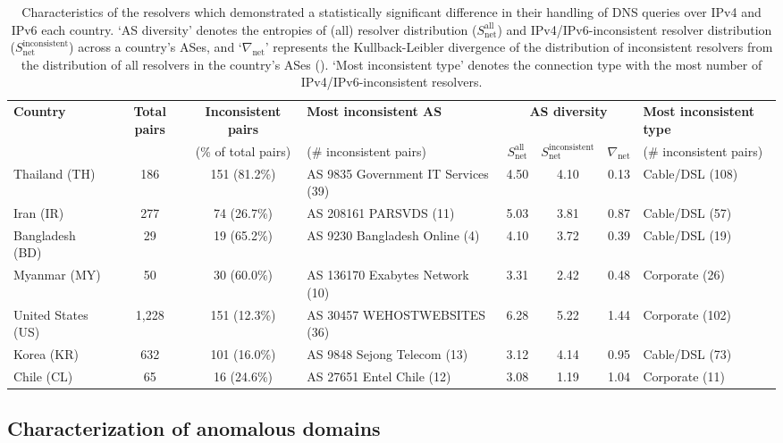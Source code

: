 \begin{table*}[t]
  \centering
  \small
  \scalebox{\tabularscale} {
    \begin{tabular}{lcclcccl}
    \toprule
      {\bf Country} & {\bf Total pairs} & {\bf Inconsistent pairs} & {\bf Most inconsistent AS} & \multicolumn{3}{c}{\bf AS diversity} & {\bf Most inconsistent type} \\
      & & {(\% of total pairs)}& {(\# inconsistent pairs)}
      & $S^{\text{all}}_{\text{net}}$ & $S^{\text{inconsistent}}_{\text{net}}$
      & $\nabla_{\text{net}}$  & {(\# inconsistent pairs)} \\
      \midrule
      Thailand (TH)            & 186    & 151 (81.2\%)  & AS 9835 Government IT Services (39)  & 4.50 & 4.10 & 0.13 & Cable/DSL (108) \\
      Iran (IR)                & 277    & 74 (26.7\%)   & AS 208161 PARSVDS (11)               & 5.03 & 3.81 & 0.87 & Cable/DSL (57) \\
      Bangladesh (BD)          & 29     & 19 (65.2\%)   & AS 9230 Bangladesh Online (4)        & 4.10 & 3.72 & 0.39 & Cable/DSL (19) \\
      Myanmar (MY)             & 50     & 30 (60.0\%)   & AS 136170 Exabytes Network (10)      & 3.31 & 2.42 & 0.48 & Corporate (26) \\
      United States (US)       & 1,228  & 151 (12.3\%)  & AS 30457 WEHOSTWEBSITES (36)         & 6.28 & 5.22 & 1.44 & Corporate (102) \\
      \midrule                 
      Korea (KR)               & 632    & 101 (16.0\%)  & AS 9848 Sejong Telecom (13)          & 3.12 & 4.14 & 0.95 & Cable/DSL (73)   \\
      Chile (CL)               & 65     & 16 (24.6\%)   & AS 27651 Entel Chile (12)            & 3.08 & 1.19 & 1.04 & Corporate (11) \\
    \bottomrule
  \end{tabular}
  }
  \caption{Characteristics of the resolvers which demonstrated a statistically
  significant difference in their handling of DNS queries over IPv4 and IPv6
  each country.
  `AS diversity' denotes the entropies of (all) resolver distribution
  ($S^{\text{all}}_{\text{net}}$) and {IPv4/IPv6}-inconsistent resolver
  distribution ($S^{\text{inconsistent}}_{\text{net}}$) across a country's
  ASes, and `$\nabla_{\text{net}}$' represents the Kullback-Leibler divergence
  of the distribution of inconsistent resolvers from the distribution of all
  resolvers in the country's ASes (\cf {}).
  `Most inconsistent type' denotes the connection type with the most number of
  {IPv4/IPv6}-inconsistent resolvers.}
  \label{tab:infrastructure:resolvers}
\end{table*}


\subsection{Characterization of anomalous domains}
\label{sec:infrastructure:domains}

